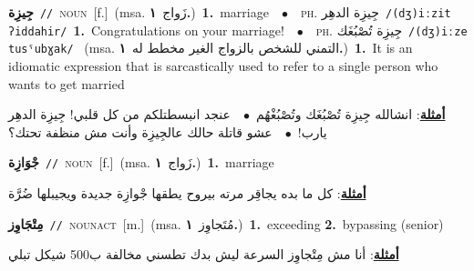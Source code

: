 \documentclass[10pt,a4paper,twoside]{article} %
\begin{document}
\begin{multicols}{2}
{\setlength\topsep{0pt}\textbf{\foreignlanguage{arabic}{جِيزِة}}\ {\color{gray}\texttt{//}\color{black}}\ \textsc{noun}\ [f.]\ \color{gray}(msa. \foreignlanguage{arabic}{زَواج}~\foreignlanguage{arabic}{\textbf{١.}})\color{black}\ \textbf{1.}~marriage\ \ $\bullet$\ \ \textsc{ph.} \color{gray} \foreignlanguage{arabic}{جِيزِة الدهِر}\color{black}\ {\color{gray}\texttt{/{\sffamily (dʒ)iːzit ʔiddahir}/}\color{black}}\ \textbf{1.}~Congratulations on your marriage!\ \ $\bullet$\ \ \textsc{ph.} \color{gray} \foreignlanguage{arabic}{جِيزِة تُصْبُغَك}\color{black}\ {\color{gray}\texttt{/{\sffamily (dʒ)iːze tusˤubɣak}/}\color{black}}\ \color{gray} (msa. \foreignlanguage{arabic}{التمني للشخص بالزواج الغير مخطط له}~\foreignlanguage{arabic}{\textbf{١.}})\color{black}\ \textbf{1.}~It is an idiomatic expression that is sarcastically used to refer to a single person who wants to get married\  \begin{flushright}\color{gray}\foreignlanguage{arabic}{\textbf{\underline{\foreignlanguage{arabic}{أمثلة}}}: انشالله جِيزِة تُصْبُغَك وتُصْبُغْهُم\ $\bullet$\ \  عنجد انبسطتلكم من كل قلبي! جِيزِة الدهِر يارب!\ $\bullet$\ \  عشو قاتلة حالك عالجِيزِة وأنت مش منظفة تحتك؟}\end{flushright}\color{black}} \vspace{2mm}

{\setlength\topsep{0pt}\textbf{\foreignlanguage{arabic}{جْوَازِة}}\ {\color{gray}\texttt{//}\color{black}}\ \textsc{noun}\ [f.]\ \color{gray}(msa. \foreignlanguage{arabic}{زَواج}~\foreignlanguage{arabic}{\textbf{١.}})\color{black}\ \textbf{1.}~marriage\  \begin{flushright}\color{gray}\foreignlanguage{arabic}{\textbf{\underline{\foreignlanguage{arabic}{أمثلة}}}: كل ما بده يجاقِر مرته بيروح يطقها جْوازِة جديدة ويجيبلها ضُرَّة}\end{flushright}\color{black}} \vspace{2mm}

{\setlength\topsep{0pt}\textbf{\foreignlanguage{arabic}{مِتْجَاوِز}}\ {\color{gray}\texttt{//}\color{black}}\ \textsc{noun\textunderscore act}\ [m.]\ \color{gray}(msa. \foreignlanguage{arabic}{مُتَجاوِز}~\foreignlanguage{arabic}{\textbf{١.}})\color{black}\ \textbf{1.}~exceeding  \textbf{2.}~bypassing (senior)\  \begin{flushright}\color{gray}\foreignlanguage{arabic}{\textbf{\underline{\foreignlanguage{arabic}{أمثلة}}}: أنا مش مِتْجاوِز السرعة ليش بدك تطسني مخالفة ب500 شيكل تبلي}\end{flushright}\color{black}} \vspace{2mm}


\end{multicols}
\end{document}
